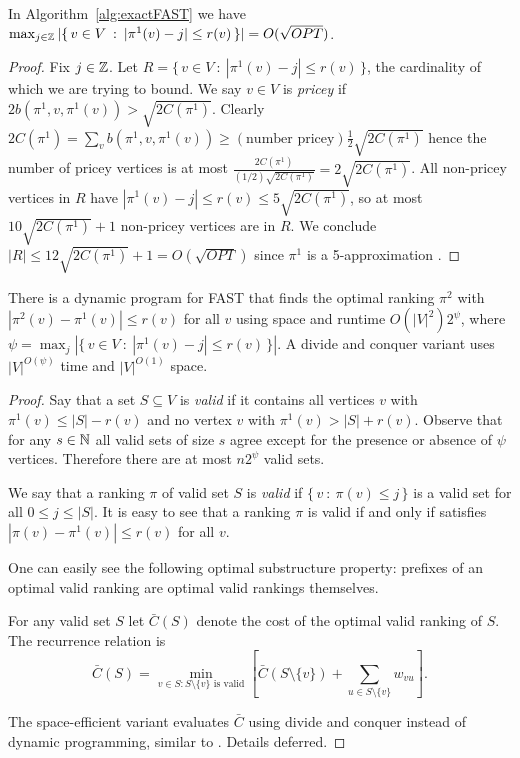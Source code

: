 \documentclass[envcountsame,oribibl]{llncs}
\newcommand{\set}[1]{\{#1\}}                        \newcommand{\setof}[2]{\{\,{#1}\::\:{#2}\,\}}        \newcommand{\groupFrac}[2]{\left(\frac{#1}{#2}\right)}
\newcommand{\sm}{\setminus} \newcommand{\compl}[1]{\overline{#1}}                \newcommand{\floor}[1]{\left\lfloor #1 \right\rfloor}
\newcommand{\fast}{\textsc{FAST}}
\begin{document}
\begin{lemma}\label{lem:psiSmallFAST}
In Algorithm~\ref{alg:exactFAST} we have $\max_{j \in \Z} |\setof{v \in V}{|\pi^1(v) - j| \le r(v)}| = O(\sqrt{OPT})$.
\end{lemma}
\begin{proof}
Fix $j \in \mathbb{Z}$. Let $R = \setof{v \in V}{|\pi^1(v) - j| \le r(v)}$, the cardinality of which we are trying to bound. We say $v \in V$ is \emph{pricey} if $2b(\pi^1,v,\pi^1(v)) > \sqrt{2C(\pi^1)}$. Clearly $2 C(\pi^1) = \sum_v b(\pi^1, v, \pi^1(v)) \ge (\text{number pricey}) \frac{1}{2}\sqrt{2C(\pi^1)}$ hence the number of pricey vertices is at most $\frac{2 C(\pi^1)}{(1/2)\sqrt{2C(\pi^1)}}=2\sqrt{2C(\pi^1)}$. All non-pricey vertices in $R$ have $|\pi^1(v) - j| \le r(v) \le 5 \sqrt{2C(\pi^1)}$, so at most $10 \sqrt{2C(\pi^1)} + 1$ non-pricey vertices are in $R$. We conclude $|R| \le 12 \sqrt{2C(\pi^1)} + 1 = O(\sqrt{OPT})$ since $\pi^1$ is a 5-approximation \cite{Coppersmith06}.
\end{proof}

\begin{lemma}\label{lem:DP}
There is a dynamic program for \fast{} that finds the optimal ranking $\pi^2$ with $|\pi^2(v) - \pi^1(v)| \le r(v)$ for all $v$ using space and runtime $O(|V|^2) 2^{\psi}$, where $\psi = \max_j |\setof{v \in V}{|\pi^1(v) - j| \le r(v)}|$. A divide and conquer variant uses $|V|^{O(\psi)}$ time and $|V|^{O(1)}$ space.
\end{lemma}

\begin{proof}
Say that a set $S \subseteq V$ is \emph{valid} if it contains all vertices $v$ with $\pi^1(v) \le |S| - r(v)$ and no vertex $v$ with $\pi^1(v) > |S| + r(v)$. Observe that for any $s \in \mathbb{N}$ all valid sets of size $s$ agree except for the presence or absence of $\psi$ vertices.  Therefore there are at most $n 2^\psi$ valid sets.

We say that a ranking $\pi$ of valid set $S$ is \emph{valid} if $\setof{v}{\pi(v) \le j}$ is a valid set for all $0 \le j \le |S|$. It is easy to see that a ranking $\pi$ is valid if and only if satisfies $|\pi(v) - \pi^1(v)| \le r(v)$ for all $v$.

One can easily see the following optimal substructure property: prefixes of an optimal  valid ranking are optimal valid rankings themselves.

For any valid set $S$ let $\bar C(S)$ denote the cost of the optimal valid ranking of $S$. The recurrence relation is
\[
\bar C(S) = \min_{v \in S : S \sm \set{v} \text{ is valid}} \left[ \bar C(S \sm \set{v}) + \sum_{u \in S \sm \set{v}} w_{vu} \right]
.\]

The space-efficient variant evaluates $\bar C$ using divide and conquer instead of dynamic programming, similar to \cite{Dom06}. Details deferred.
\end{proof}
\end{document}
